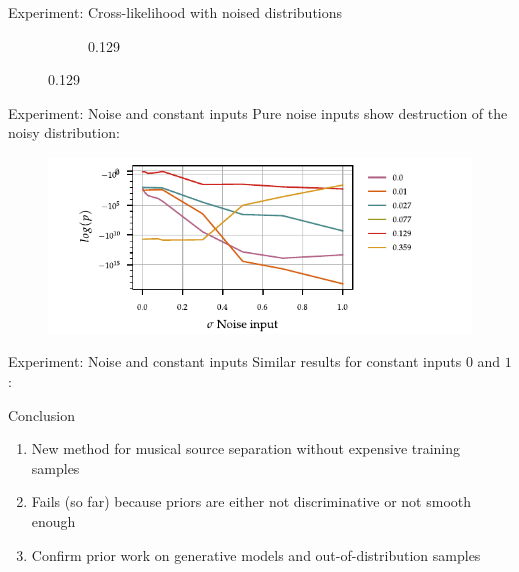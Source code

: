 \documentclass{beamer}
\begin{document}
\begin{frame}{Experiment: Cross-likelihood with noised distributions}
\begin{figure}
\begin{subfigure}{0.3\textwidth}
                \caption{0.129}
            \end{subfigure}%
        \end{figure}
    \end{frame}

    \begin{frame}{Experiment: Noise and constant inputs}
        Pure noise inputs show destruction of the noisy distribution:
        \begin{figure}
            \centering
            \includegraphics[width=\textwidth]{const_noise_ll.pdf}%
        \end{figure}
    \end{frame}

    \begin{frame}{Experiment: Noise and constant inputs}
        Similar results for constant inputs \(0\) and \(1\):

        \begin{table}
        \end{table}
    \end{frame}

    \begin{frame}{Conclusion}
        \begin{enumerate}
            \item New method for musical source separation without expensive training samples
            \item Fails (so far) because priors are either not discriminative or not smooth enough
            \item Confirm prior work on generative models and out-of-distribution samples
        \end{enumerate}
    \end{frame}

    \begin{frame}[standout]
    \end{frame}
\end{document}
